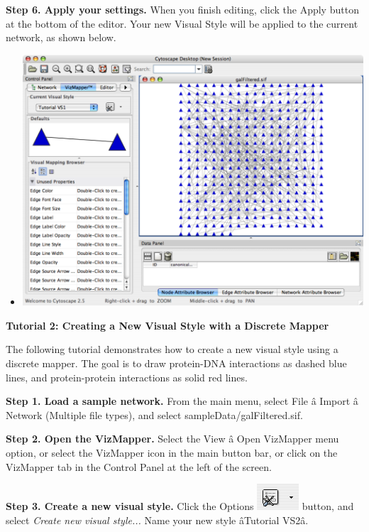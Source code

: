  \textbf{Step 6. Apply your settings.}
 When you finish editing, click the Apply button at the bottom of the editor. Your new Visual Style will be applied to the current network, as shown below. 
\begin{itemize}
\item 

 \includegraphics[width=.6\textwidth]{images/Tut1GalFiltered.png} 


\end{itemize}


 
\textbf{Tutorial 2: Creating a New Visual Style with a Discrete Mapper}


 The following tutorial demonstrates how to create a new visual style using a discrete mapper. The goal is to draw protein-DNA interactions as dashed blue lines, and protein-protein interactions as solid red lines. 


 \textbf{Step 1. Load a sample network.}
 From the main menu, select File \^a Import \^a Network (Multiple file types), and select sampleData/galFiltered.sif. 


 \textbf{Step 2. Open the VizMapper.}
 Select the View \^a Open VizMapper menu option, or select the VizMapper icon in the main button bar, or click on the VizMapper tab in the Control Panel at the left of the screen. 


 \textbf{Step 3. Create a new visual style.}
 Click the Options \includegraphics[width=.6\textwidth]{images/VizMapOptionIcon.png}  button, and select \emph{Create new visual style...}
 Name your new style \^aTutorial VS2\^a. 


